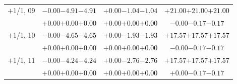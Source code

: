 \documentclass[compress]{beamer}
\begin{document}
\begin{frame}
\begin{tabular}{r | c | c | c}
$+$1/1, 09 & $-0.00$\hspace{0.1 cm}$-4.91$\hspace{0.1 cm}\textcolor{black}{$-4.91$} & $+0.00$\hspace{0.1 cm}$-1.04$\hspace{0.1 cm}\textcolor{black}{$-1.04$} & $+21.00$\hspace{0.1 cm}$+21.00$\hspace{0.1 cm}\textcolor{black}{$+21.00$} \\
           & $+0.00$\hspace{0.1 cm}$+0.00$\hspace{0.1 cm}\textcolor{black}{$+0.00$} & $+0.00$\hspace{0.1 cm}$+0.00$\hspace{0.1 cm}\textcolor{black}{$+0.00$} & $-0.00$\hspace{0.1 cm}$-0.17$\hspace{0.1 cm}\textcolor{black}{$-0.17$} \\
$+$1/1, 10 & $-0.00$\hspace{0.1 cm}$-4.65$\hspace{0.1 cm}\textcolor{black}{$-4.65$} & $+0.00$\hspace{0.1 cm}$-1.93$\hspace{0.1 cm}\textcolor{black}{$-1.93$} & $+17.57$\hspace{0.1 cm}$+17.57$\hspace{0.1 cm}\textcolor{black}{$+17.57$} \\
           & $+0.00$\hspace{0.1 cm}$+0.00$\hspace{0.1 cm}\textcolor{black}{$+0.00$} & $+0.00$\hspace{0.1 cm}$+0.00$\hspace{0.1 cm}\textcolor{black}{$+0.00$} & $-0.00$\hspace{0.1 cm}$-0.17$\hspace{0.1 cm}\textcolor{black}{$-0.17$} \\
$+$1/1, 11 & $-0.00$\hspace{0.1 cm}$-4.24$\hspace{0.1 cm}\textcolor{black}{$-4.24$} & $+0.00$\hspace{0.1 cm}$-2.76$\hspace{0.1 cm}\textcolor{black}{$-2.76$} & $+17.57$\hspace{0.1 cm}$+17.57$\hspace{0.1 cm}\textcolor{black}{$+17.57$} \\
           & $+0.00$\hspace{0.1 cm}$+0.00$\hspace{0.1 cm}\textcolor{black}{$+0.00$} & $+0.00$\hspace{0.1 cm}$+0.00$\hspace{0.1 cm}\textcolor{black}{$+0.00$} & $+0.00$\hspace{0.1 cm}$-0.17$\hspace{0.1 cm}\textcolor{black}{$-0.17$} \\

\end{tabular}
\end{frame}
\end{document}
